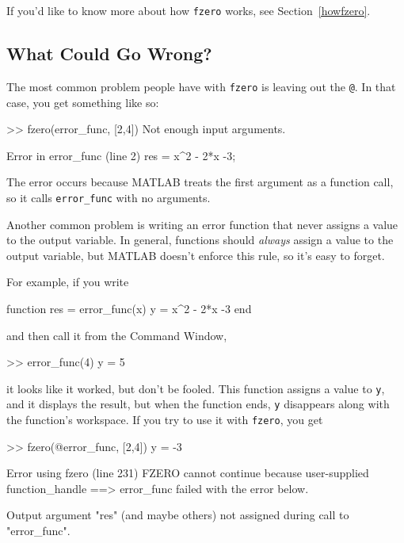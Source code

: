 \documentclass[../../book.tex]{subfiles}
\begin{document}
If you'd like to know more about how \lstinline{fzero} works, see Section~\ref{howfzero}.


\subsection{What Could Go Wrong?}

The most common problem people have with \lstinline{fzero} is leaving
out the \lstinline{@}.  In that case, you get something like so:

\begin{code}
>> fzero(error_func, [2,4])
Not enough input arguments.

Error in error_func (line 2)
    res = x^2 - 2*x -3;
\end{code}

The error occurs because MATLAB treats the first argument as a function call, so it calls \lstinline{error_func} with no arguments.


Another common problem is writing an error function that never
assigns a value to the output variable.  In general, functions should
\emph{always} assign a value to the output variable, but MATLAB doesn't
enforce this rule, so it's easy to forget.

For example, if you
write

\begin{code}
function res = error_func(x)
    y = x^2 - 2*x -3
end
\end{code}
and then call it from the Command Window,
\begin{code}
>> error_func(4)
y = 5
\end{code}
it looks like it worked, but don't be fooled.  This function assigns
a value to \lstinline{y}, and it displays the result, but when the function
ends, \lstinline{y} disappears along with the function's workspace.
If you try to use it with \lstinline{fzero}, you get

\begin{code}
>> fzero(@error_func, [2,4])
y = -3

Error using fzero (line 231)
FZERO cannot continue because user-supplied function_handle ==>
error_func failed with the error below.

Output argument "res" (and maybe others) not assigned during call
to "error_func".
\end{code}
\end{document}
